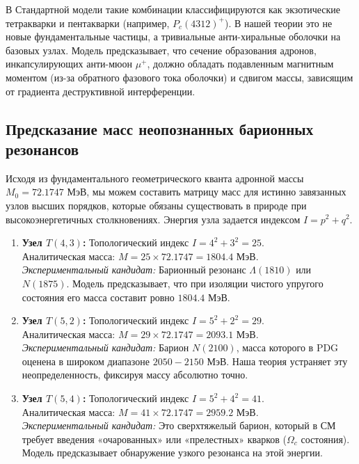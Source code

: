 \documentclass[12pt,a4paper]{article}
\begin{document}
	В Стандартной модели такие комбинации классифицируются как экзотические тетракварки и пентакварки (например, $P_c(4312)^+$). В нашей теории это не новые фундаментальные частицы, а тривиальные анти-хиральные оболочки на базовых узлах. Модель предсказывает, что сечение образования адронов, инкапсулирующих анти-мюон $\mu^+$, должно обладать подавленным магнитным моментом (из-за обратного фазового тока оболочки) и сдвигом массы, зависящим от градиента деструктивной интерференции.
	
	\subsection{Предсказание масс неопознанных барионных резонансов}
	Исходя из фундаментального геометрического кванта адронной массы $M_0 = 72.1747$ МэВ, мы можем составить матрицу масс для истинно завязанных узлов высших порядков, которые обязаны существовать в природе при высокоэнергетичных столкновениях. Энергия узла задается индексом $I = p^2 + q^2$.
	
	\begin{enumerate}
		\item \textbf{Узел $T(4,3)$:} Топологический индекс $I = 4^2 + 3^2 = 25$. \\
		Аналитическая масса: $M = 25 \times 72.1747 = \mathbf{1804.4 \text{ МэВ}}$. \\
		\textit{Экспериментальный кандидат:} Барионный резонанс $\Lambda(1810)$ или $N(1875)$. Модель предсказывает, что при изоляции чистого упругого состояния его масса составит ровно $1804.4$ МэВ.
		
		\item \textbf{Узел $T(5,2)$:} Топологический индекс $I = 5^2 + 2^2 = 29$. \\
		Аналитическая масса: $M = 29 \times 72.1747 = \mathbf{2093.1 \text{ МэВ}}$. \\
		\textit{Экспериментальный кандидат:} Барион $N(2100)$, масса которого в PDG оценена в широком диапазоне $2050 - 2150$ МэВ. Наша теория устраняет эту неопределенность, фиксируя массу абсолютно точно.
		
		\item \textbf{Узел $T(5,4)$:} Топологический индекс $I = 5^2 + 4^2 = 41$. \\
		Аналитическая масса: $M = 41 \times 72.1747 = \mathbf{2959.2 \text{ МэВ}}$. \\
		\textit{Экспериментальный кандидат:} Это сверхтяжелый барион, который в СМ требует введения «очарованных» или «прелестных» кварков ($\Omega_c$ состояния). Модель предсказывает обнаружение узкого резонанса на этой энергии.
	\end{enumerate}
	
\end{document}
